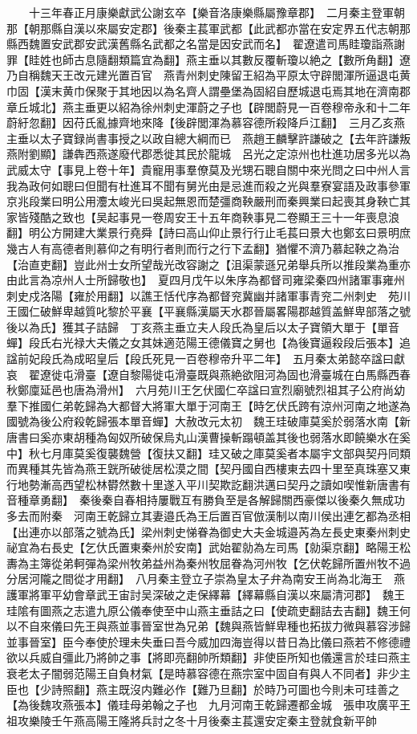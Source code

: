 　　十三年春正月康樂獻武公謝玄卒【樂音洛康樂縣屬豫章郡】　二月秦主登軍朝那【朝那縣自漢以來屬安定郡】後秦主萇軍武都【此武都亦當在安定界五代志朝那縣西魏置安武郡安武漢舊縣名武都之名當是因安武而名】　翟遼遣司馬眭瓊詣燕謝罪【眭姓也師古息隨翻類篇宜為翻】燕主垂以其數反覆斬瓊以絶之【數所角翻】遼乃自稱魏天王改元建光置百官　燕青州刺史陳留王紹為平原太守辟閭渾所逼退屯黄巾固【漢末黄巾保聚于其地因以為名齊人謂壘堡為固紹自歷城退屯焉其地在濟南郡章丘城北】燕主垂更以紹為徐州刺史渾蔚之子也【辟閭蔚見一百卷穆帝永和十二年蔚紆忽翻】因苻氏亂據齊地來降【後辟閭渾為慕容德所殺降戶江翻】　三月乙亥燕主垂以太子寶録尚書事授之以政自總大綱而已　燕趙王麟擊許謙破之【去年許謙叛燕附劉顯】謙犇西燕遂廢代郡悉徙其民於龍城　呂光之定涼州也杜進功居多光以為武威太守【事見上卷十年】貴寵用事羣僚莫及光甥石聰自關中來光問之曰中州人言我為政何如聰曰但聞有杜進耳不聞有舅光由是忌進而殺之光與羣寮宴語及政事參軍京兆段業曰明公用灋太峻光曰吳起無恩而楚彊商鞅嚴刑而秦興業曰起喪其身鞅亡其家皆殘酷之致也【吴起事見一卷周安王十五年商鞅事見二卷顯王三十一年喪息浪翻】明公方開建大業景行堯舜【詩曰高山仰止景行行止毛萇曰景大也鄭玄曰景明庶幾古人有高德者則慕仰之有明行者則而行之行下孟翻】猶懼不濟乃慕起鞅之為治【治直吏翻】豈此州士女所望哉光改容謝之【沮渠蒙遜兄弟舉兵所以推段業為重亦由此言為凉州人士所歸敬也】　夏四月戊午以朱序為都督司雍梁秦四州諸軍事雍州刺史戍洛陽【雍於用翻】以譙王恬代序為都督兖冀幽并諸軍事青兖二州刺史　苑川王國仁破鮮卑越質叱黎於平襄【平襄縣漢屬天水郡晉屬畧陽郡越質盖鮮卑部落之號後以為氏】獲其子詰歸　丁亥燕主垂立夫人段氏為皇后以太子寶領大單于【單音蟬】段氏右光禄大夫儀之女其妹適范陽王德儀寶之舅也【為後寶逼殺段后張本】追諡前妃段氏為成昭皇后【段氏死見一百卷穆帝升平二年】　五月秦太弟懿卒諡曰獻哀　翟遼徙屯滑臺【遼自黎陽徙屯滑臺既與燕絶欲阻河為固也滑臺城在白馬縣西春秋鄭廩延邑也唐為滑州】　六月苑川王乞伏國仁卒諡曰宣烈廟號烈祖其子公府尚幼羣下推國仁弟乾歸為大都督大將軍大單于河南王【時乞伏氏跨有涼州河南之地遂為國號為後公府殺乾歸張本單音蟬】大赦改元太初　魏王珪破庫莫奚於弱落水南【新唐書曰奚亦東胡種為匈奴所破保烏丸山漢曹操斬蹋頓盖其後也弱落水即饒樂水在奚中】秋七月庫莫奚復襲魏營【復扶又翻】珪又破之庫莫奚者本屬宇文部與契丹同類而異種其先皆為燕王皝所破徙居松漠之間【契丹國自西樓東去四十里至真珠塞又東行地勢漸高西望松林欎然數十里遂入平川契欺訖翻洪邁曰契丹之讀如喫惟新唐書有音種章勇翻】　秦後秦自春相持屢戰互有勝負至是各解歸關西豪傑以後秦久無成功多去而附秦　河南王乾歸立其妻邉氏為王后置百官倣漢制以南川侯出連乞都為丞相【出連亦以部落之號為氏】梁州刺史悌眷為御史大夫金城邉芮為左長史東秦州刺史祕宜為右長史【乞㐲氏置東秦州於安南】武始翟勍為左司馬【勍渠京翻】略陽王松夀為主簿從弟軻彈為梁州牧弟益州為秦州牧屈眷為河州牧【乞伏乾歸所置州牧不過分居河隴之間從才用翻】　八月秦主登立子崇為皇太子弁為南安王尚為北海王　燕護軍將軍平幼會章武王宙討吴深破之走保繹幕【繹幕縣自漢以來屬清河郡】　魏王珪隂有圖燕之志遣九原公儀奉使至中山燕主垂詰之曰【使疏吏翻詰去吉翻】魏王何以不自來儀曰先王與燕並事晉室世為兄弟【魏與燕皆鮮卑種也拓拔力微與慕容涉歸並事晉室】臣今奉使於理未失垂曰吾今威加四海豈得以昔日為比儀曰燕若不修德禮欲以兵威自彊此乃將帥之事【將即亮翻帥所類翻】非使臣所知也儀還言於珪曰燕主衰老太子闇弱范陽王自負材氣【是時慕容德在燕宗室中固自有與人不同者】非少主臣也【少詩照翻】燕主既沒内難必作【難乃旦翻】於時乃可圖也今則未可珪善之【為後魏攻燕張本】儀珪母弟翰之子也　九月河南王乾歸遷都金城　張申攻廣平王祖攻樂陵壬午燕高陽王隆將兵討之冬十月後秦主萇還安定秦主登就食新平帥